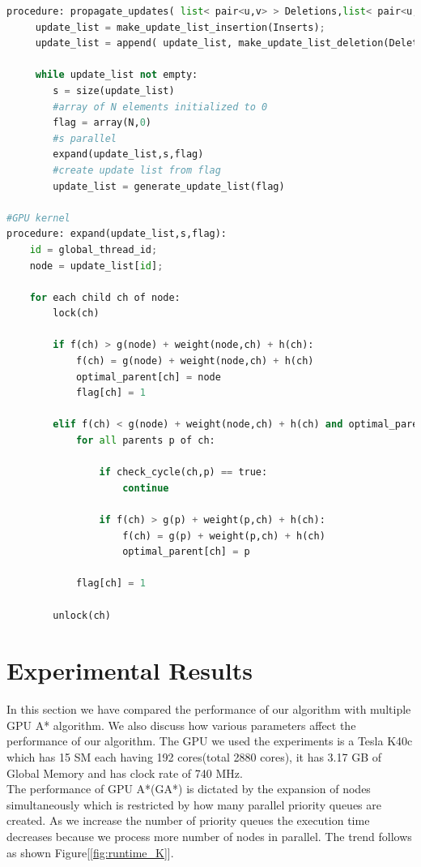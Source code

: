 \documentclass[a4paper]{article}
\begin{document}
\begin{lstlisting}[language=python, caption=Propagation of Updates]
procedure: propagate_updates( list< pair<u,v> > Deletions,list< pair<u,v> > Inserts, E, N):
     update_list = make_update_list_insertion(Inserts);
     update_list = append( update_list, make_update_list_deletion(Deletions) )
     
     while update_list not empty:
        s = size(update_list)
        #array of N elements initialized to 0
        flag = array(N,0)
        #s parallel
        expand(update_list,s,flag)
        #create update list from flag
        update_list = generate_update_list(flag)

#GPU kernel
procedure: expand(update_list,s,flag):
    id = global_thread_id;
    node = update_list[id];
    
    for each child ch of node:
        lock(ch)
        
        if f(ch) > g(node) + weight(node,ch) + h(ch):
            f(ch) = g(node) + weight(node,ch) + h(ch)  
            optimal_parent[ch] = node
            flag[ch] = 1
        
        elif f(ch) < g(node) + weight(node,ch) + h(ch) and optimal_parent[ch] == node:
            for all parents p of ch:
             
                if check_cycle(ch,p) == true:
                    continue
             
                if f(ch) > g(p) + weight(p,ch) + h(ch):
                    f(ch) = g(p) + weight(p,ch) + h(ch)
                    optimal_parent[ch] = p
            
            flag[ch] = 1
        
        unlock(ch)
\end{lstlisting}


\section{Experimental Results}
In this section we have compared the performance of our algorithm with multiple GPU A* algorithm. We also discuss how various parameters affect the performance of our algorithm. The GPU we used the experiments is a Tesla K40c which has 15 SM each having 192 cores(total 2880 cores), it has 3.17 GB of Global Memory and has clock rate of 740 MHz.\\
The performance of GPU A*(GA*)\cite{GA*} is dictated by the expansion of nodes simultaneously which is restricted by how many parallel priority queues are created. As we increase the number of priority queues the execution time decreases because we process more number of nodes in parallel. The trend follows as shown Figure[\ref{fig:runtime_K}].
\end{document}
